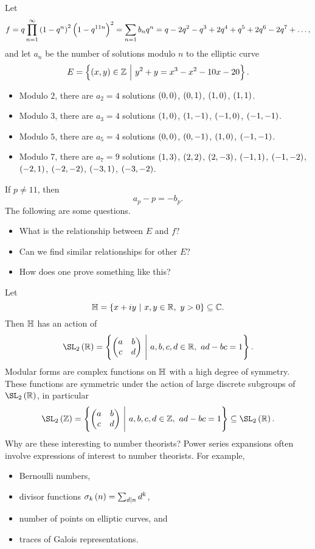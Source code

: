 Let
$$ f = q\prod_{n = 1}^\infty \br{1 - q^n}^2\br{1 - q^{11n}}^2 = \sum_{n = 1} b_nq^n = q - 2q^2 - q^3 + 2q^4 + q^5 + 2q^6 - 2q^7 + \dots, $$
and let $ a_n $ be the number of solutions modulo $ n $ to the elliptic curve
$$ E = \cbr{\br{x, y} \in \ZZ \st y^2 + y = x^3 - x^2 - 10x - 20}. $$
\begin{itemize}
\item Modulo $ 2 $, there are $ a_2 = 4 $ solutions $ \br{0, 0} $, $ \br{0, 1} $, $ \br{1, 0} $, $ \br{1, 1} $.
\item Modulo $ 3 $, there are $ a_3 = 4 $ solutions $ \br{1, 0} $, $ \br{1, -1} $, $ \br{-1, 0} $, $ \br{-1, -1} $.
\item Modulo $ 5 $, there are $ a_5 = 4 $ solutions $ \br{0, 0} $, $ \br{0, -1} $, $ \br{1, 0} $, $ \br{-1, -1} $.
\item Modulo $ 7 $, there are $ a_7 = 9 $ solutions $ \br{1, 3} $, $ \br{2, 2} $, $ \br{2, -3} $, $ \br{-1, 1} $, $ \br{-1, -2} $, $ \br{-2, 1} $, $ \br{-2, -2} $, $ \br{-3, 1} $, $ \br{-3, -2} $.
\end{itemize}
If $ p \ne 11 $, then
$$ a_p - p = -b_p. $$
The following are some questions.
\begin{itemize}
\item What is the relationship between $ E $ and $ f $?
\item Can we find similar relationships for other $ E $?
\item How does one prove something like this?
\end{itemize}
Let
$$ \HH = \cbr{x + iy \st x, y \in \RR, \ y > 0} \subseteq \CC. $$
Then $ \mathbb{H} $ has an action of
$$ \SL_2\br{\RR} = \cbr{\twobytwo{a}{b}{c}{d} \st a, b, c, d \in \RR, \ ad - bc = 1}. $$
Modular forms are complex functions on $ \mathbb{H} $ with a high degree of symmetry. These functions are symmetric under the action of large discrete subgroups of $ \SL_2\br{\RR} $, in particular
$$ \SL_2\br{\ZZ} = \cbr{\twobytwo{a}{b}{c}{d} \st a, b, c, d \in \ZZ, \ ad - bc = 1} \subseteq \SL_2\br{\RR}. $$
Why are these interesting to number theorists? Power series expansions often involve expressions of interest to number theorists. For example,
\begin{itemize}
\item Bernoulli numbers,
\item divisor functions $ \sigma_k\br{n} = \sum_{d \mid n} d^k $,
\item number of points on elliptic curves, and
\item traces of Galois representations.
\end{itemize}

